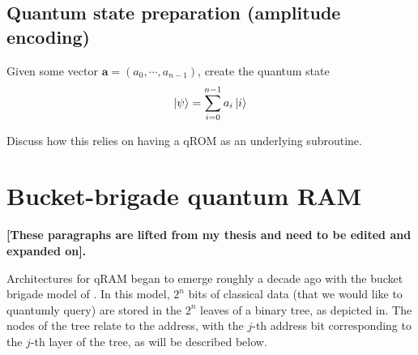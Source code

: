 \documentclass[a4paper,10pt]{article}
\begin{document}
{{\subsection{Quantum state preparation (amplitude encoding)}

Given some vector $\mathbf{a} = \left( a_0, \cdots,  a_{n-1} \right)$, create the quantum state
\begin{equation}
 \ket{\psi} = \sum_{i=0}^{n-1} a_i \ket{i}
\end{equation}

Discuss how this relies on having a qROM as an underlying subroutine.




\section{Bucket-brigade quantum RAM}
\label{sec:bb}

\textbf{[These paragraphs are lifted from my thesis and need to be edited and expanded on].}

Architectures for qRAM began to emerge roughly a decade ago with the bucket brigade model of \cite{Giovannetti2008, Giovannetti2008b}. In this model, $2^n$ bits of classical data (that we would like to quantumly query) are stored in the $2^n$ leaves of a binary tree, as depicted in. The nodes of the tree relate to the address, with the $j$-th address bit corresponding to the $j$-th layer of the tree, as will be described below. 

}}
\end{document}
